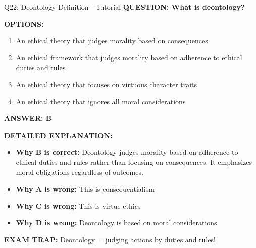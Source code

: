 \documentclass[8pt]{beamer}
\begin{document}
	\begin{frame}{Q22: Deontology Definition - Tutorial}
		\fontsize{6.5}{7.5}\selectfont
		\textbf{QUESTION: What is deontology?}
		
		\vspace{0.1cm}
		\textbf{OPTIONS:}
		\begin{enumerate}
			\item An ethical theory that judges morality based on consequences
			\item An ethical framework that judges morality based on adherence to ethical duties and rules
			\item An ethical theory that focuses on virtuous character traits
			\item An ethical theory that ignores all moral considerations
		\end{enumerate}
		
		\vspace{0.1cm}
		\textcolor{myblue}{\textbf{ANSWER: B}}
		
		\vspace{0.1cm}
		\textbf{DETAILED EXPLANATION:}
		\begin{itemize}
			\item \textbf{Why B is correct:} Deontology judges morality based on adherence to ethical duties and rules rather than focusing on consequences. It emphasizes moral obligations regardless of outcomes.
			\item \textbf{Why A is wrong:} This is consequentialism
			\item \textbf{Why C is wrong:} This is virtue ethics
			\item \textbf{Why D is wrong:} Deontology is based on moral considerations
		\end{itemize}
		
		\textcolor{myred}{\textbf{EXAM TRAP:}} Deontology = \textcolor{myblue}{judging actions by duties and rules}!
	\end{frame}
	
\end{document}
